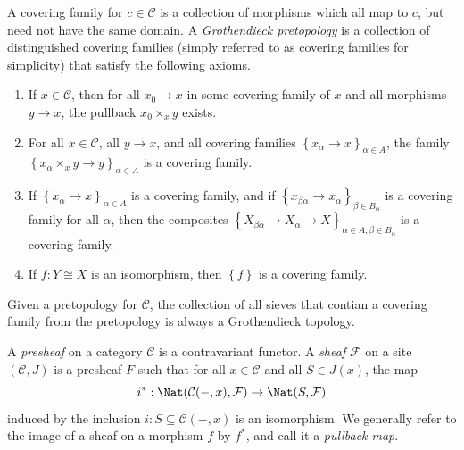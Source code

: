\begin{definition}\label{dfn:3-5-3}
	A covering family for $c\in \mathcal{C} $ is a collection of morphisms which all map to $c$, but need not have the same domain. A \emph{Grothendieck pretopology} is a collection of distinguished covering families (simply referred to as covering families for simplicity) that satisfy the following axioms.
	\begin{enumerate}
		\item If $x\in \mathcal{C} $, then for all $x_0\to x$ in some covering family of $x$ and all morphisms $y\to x$, the pullback $x_0\times _xy$ exists.
		\item For all $x\in \mathcal{C} $, all $y\to x$, and all covering families $\left\{ x_\alpha \to x \right\} _{\alpha \in A} $, the family $\left\{ x_\alpha \times _xy \to y \right\}_{\alpha \in A} $ is a covering family.
		\item If $\left\{ x_\alpha \to x \right\} _{\alpha \in A} $ is a covering family, and if $\left\{ x_{\beta \alpha } \to x_\alpha   \right\} _{\beta \in B_\alpha } $ is a covering family for all $\alpha $, then the composites $\left\{ X_{\beta \alpha } \to X_\alpha \to X \right\}_{\alpha \in A,\beta \in B_\alpha } $ is a covering family.
		\item If $f : Y \cong X$ is an isomorphism, then $\left\{ f \right\} $ is a covering family.
	\end{enumerate}
	Given a pretopology for $\mathcal{C} $, the collection of all sieves that contian a covering family from the pretopology is always a Grothendieck topology.
\end{definition}

\begin{definition}\label{dfn:3-5-4}
	A \emph{presheaf} on a category $\mathcal{C} $ is a contravariant functor. A \emph{sheaf} $\mathcal{F} $ on a site $(\mathcal{C} ,J)$ is a presheaf $F$ such that for all $x\in \mathcal{C}$ and all $S\in J(x)$, the map
	\[
		i^* : \Nat(\mathcal{C} (-,x),\mathcal{F} ) \to \Nat(S,\mathcal{F} )
	\]
	induced by the inclusion $i : S \subseteq \mathcal{C} (-,x)$ is an isomorphism. We generally refer to the image of a sheaf on a morphism $f$ by $f^*$, and call it a \emph{pullback map}.
\end{definition}

